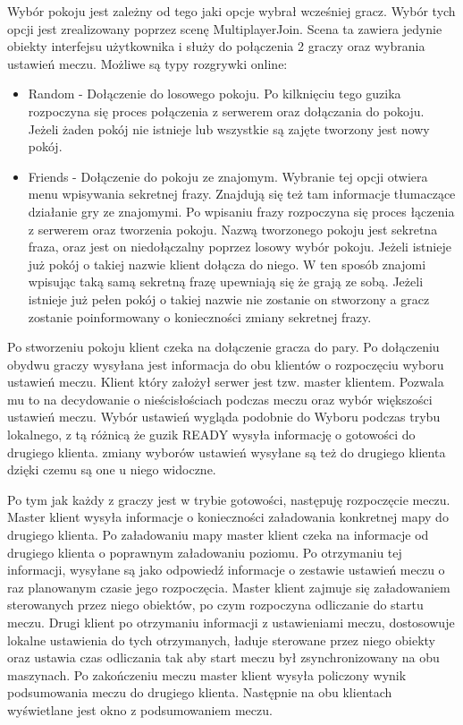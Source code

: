 \documentclass[a4paper,12pt,twoside,openany]{report}
\begin{document}
Wybór pokoju jest zależny od tego jaki opcje wybrał wcześniej gracz. Wybór tych opcji jest zrealizowany poprzez scenę MultiplayerJoin. Scena ta zawiera jedynie obiekty interfejsu użytkownika i służy do połączenia 2 graczy  oraz wybrania ustawień meczu. Możliwe są  typy rozgrywki online:
\begin{itemize}
    \item Random - Dołączenie do losowego pokoju. Po kilknięciu tego guzika rozpoczyna się proces połączenia z serwerem oraz dołączania do pokoju. Jeżeli żaden pokój nie istnieje lub wszystkie są zajęte tworzony jest nowy pokój.
    \item Friends - Dołączenie do pokoju ze znajomym. Wybranie tej opcji otwiera menu wpisywania sekretnej frazy. Znajdują się też tam informacje tłumaczące działanie gry ze znajomymi. Po wpisaniu frazy rozpoczyna się proces łączenia z serwerem oraz tworzenia pokoju. Nazwą tworzonego pokoju jest sekretna fraza, oraz jest on niedołączalny poprzez losowy wybór pokoju. Jeżeli istnieje już pokój o takiej nazwie klient dołącza do niego. W ten sposób znajomi wpisując taką samą sekretną frazę upewniają się że grają ze sobą. Jeżeli istnieje już pełen pokój o takiej nazwie nie zostanie on stworzony a gracz zostanie poinformowany o konieczności zmiany sekretnej frazy.
\end{itemize}

Po stworzeniu pokoju klient czeka na dołączenie gracza do pary. Po dołączeniu obydwu graczy wysyłana jest informacja do obu klientów o rozpoczęciu wyboru ustawień meczu. Klient który założył serwer jest tzw. master klientem. Pozwala mu to na decydowanie o nieścisłościach podczas meczu oraz wybór większości ustawień meczu. Wybór ustawień wygląda podobnie do Wyboru podczas trybu lokalnego, z tą różnicą że guzik READY wysyła informację o gotowości do drugiego klienta. zmiany wyborów ustawień wysyłane są też do drugiego klienta dzięki czemu są one u niego widoczne.

Po tym jak każdy z graczy jest w trybie gotowości, następuję rozpoczęcie meczu. Master klient wysyła informacje o konieczności załadowania konkretnej mapy do drugiego klienta. Po załadowaniu mapy master klient czeka na informacje od drugiego klienta o poprawnym załadowaniu poziomu. Po otrzymaniu tej informacji, wysyłane są jako odpowiedź informacje o zestawie ustawień meczu o raz planowanym czasie jego rozpoczęcia. Master klient zajmuje się załadowaniem sterowanych przez niego obiektów, po czym rozpoczyna odliczanie do startu meczu. Drugi klient po otrzymaniu informacji z ustawieniami meczu, dostosowuje lokalne ustawienia do tych otrzymanych, ładuje sterowane przez niego obiekty oraz ustawia czas odliczania tak aby start meczu był zsynchronizowany na obu maszynach. Po zakończeniu meczu master klient wysyła policzony wynik podsumowania meczu do drugiego klienta. Następnie na obu klientach wyświetlane jest okno z podsumowaniem meczu.
\end{document}
